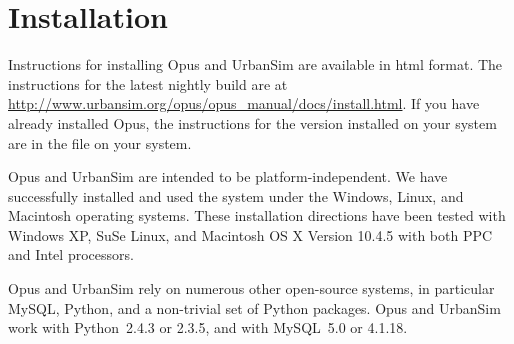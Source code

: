 

\chapter{Installation}
\label{chapter:installation}


Instructions for installing Opus and UrbanSim are available in html
format.  The instructions for the latest nightly build are at
\url{http://www.urbansim.org/opus/opus_manual/docs/install.html}.
If you have already installed Opus, the instructions for the version
installed on your system are in the
 file on your system.

Opus and UrbanSim are intended to be platform-independent.
 We have successfully installed and used the
system under the Windows, \windowsindex Linux, \linuxindex and Macintosh
\macintoshindex operating systems. These installation directions have been
tested with Windows XP, \windowstestindex SuSe Linux, \suseindex
\linuxtestindex and Macintosh OS X Version 10.4.5 \macintoshtestindex with both
PPC  and Intel \intelindex{} processors.

Opus and UrbanSim rely on numerous other open-source systems, in particular
MySQL, Python, and a non-trivial set of Python packages.  Opus and UrbanSim
work with Python~2.4.3 or 2.3.5, \pythonversionindex and with
MySQL~5.0 or 4.1.18.\mysqlversionindex


